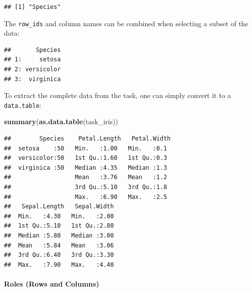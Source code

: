 \documentclass[]{article}
\newenvironment{Shaded}{\begin{snugshade}}{\end{snugshade}}
\newcommand{\CommentTok}[1]{\textcolor[rgb]{0.56,0.35,0.01}{\textit{#1}}}
\newcommand{\DataTypeTok}[1]{\textcolor[rgb]{0.13,0.29,0.53}{#1}}
\newcommand{\DecValTok}[1]{\textcolor[rgb]{0.00,0.00,0.81}{#1}}
\newcommand{\KeywordTok}[1]{\textcolor[rgb]{0.13,0.29,0.53}{\textbf{#1}}}
\newcommand{\NormalTok}[1]{#1}
\newcommand{\OperatorTok}[1]{\textcolor[rgb]{0.81,0.36,0.00}{\textbf{#1}}}
\newcommand{\StringTok}[1]{\textcolor[rgb]{0.31,0.60,0.02}{#1}}
\let\oldparagraph\paragraph
\renewcommand{\paragraph}[1]{\oldparagraph{#1}\mbox{}}
\renewenvironment{Shaded} {\begin{snugshade}\small} {\end{snugshade}}
\begin{document}
\begin{verbatim}
## [1] "Species"
\end{verbatim}

The \texttt{row\_ids} and column names can be combined when selecting a subset of the data:

\begin{Shaded}
\end{Shaded}

\begin{verbatim}
##       Species
## 1:     setosa
## 2: versicolor
## 3:  virginica
\end{verbatim}

To extract the complete data from the task, one can simply convert it to a \texttt{data.table}:

\begin{Shaded}
\begin{Highlighting}[]
\KeywordTok{summary}\NormalTok{(}\KeywordTok{as.data.table}\NormalTok{(task_iris))}
\end{Highlighting}
\end{Shaded}

\begin{verbatim}
##        Species    Petal.Length   Petal.Width 
##  setosa    :50   Min.   :1.00   Min.   :0.1  
##  versicolor:50   1st Qu.:1.60   1st Qu.:0.3  
##  virginica :50   Median :4.35   Median :1.3  
##                  Mean   :3.76   Mean   :1.2  
##                  3rd Qu.:5.10   3rd Qu.:1.8  
##                  Max.   :6.90   Max.   :2.5  
##   Sepal.Length   Sepal.Width  
##  Min.   :4.30   Min.   :2.00  
##  1st Qu.:5.10   1st Qu.:2.80  
##  Median :5.80   Median :3.00  
##  Mean   :5.84   Mean   :3.06  
##  3rd Qu.:6.40   3rd Qu.:3.30  
##  Max.   :7.90   Max.   :4.40
\end{verbatim}

\hypertarget{tasks-roles}{%
\paragraph{Roles (Rows and Columns)}\label{tasks-roles}}
\end{document}
